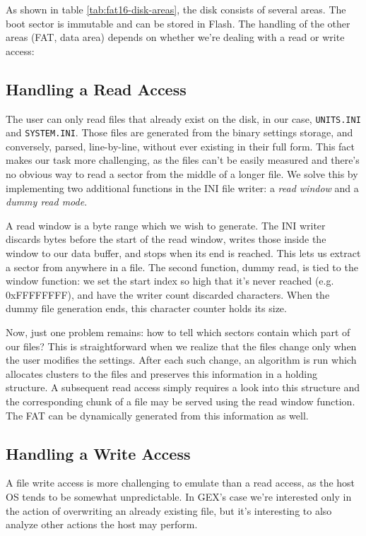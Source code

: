 As shown in table \ref{tab:fat16-disk-areas}, the disk consists of several areas. The boot sector is immutable and can be stored in Flash. The handling of the other areas (\gls{FAT}, data area) depends on whether we're dealing with a read or write access:

\subsection{Handling a Read Access}

The user can only read files that already exist on the disk, in our case, \verb|UNITS.INI| and \verb|SYSTEM.INI|. Those files are generated from the binary settings storage, and conversely, parsed, line-by-line, without ever existing in their full form. This fact makes our task more challenging, as the files can't be easily measured and there's no obvious way to read a sector from the middle of a longer file. We solve this by implementing two additional functions in the INI file writer: a \textit{read window} and a \textit{dummy read mode}.

A read window is a byte range which we wish to generate. The INI writer discards bytes before the start of the read window, writes those inside the window to our data buffer, and stops when its end is reached. This lets us extract a sector from anywhere in a file. The second function, dummy read, is tied to the window function: we set the start index so high that it's never reached (e.g. 0xFFFFFFFF), and have the writer count discarded characters. When the dummy file generation ends, this character counter holds its size.

Now, just one problem remains: how to tell which sectors contain which part of our files? This is straightforward when we realize that the files change only when the user modifies the settings. After each such change, an algorithm is run which allocates clusters to the files and preserves this information in a holding structure. A subsequent read access simply requires a look into this structure and the corresponding chunk of a file may be served using the read window function. The \gls{FAT} can be dynamically generated from this information as well.

\subsection{Handling a Write Access}

A file write access is more challenging to emulate than a read access, as the host OS tends to be somewhat unpredictable. In GEX's case we're interested only in the action of overwriting an already existing file, but it's interesting to also analyze other actions the host may perform. 

